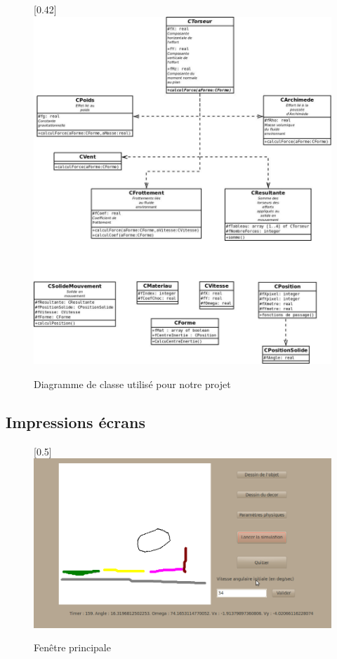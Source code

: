 \begin{center}
\begin{figure}[h]
\begin{center}
\scalebox{0.5}[0.42]{\includegraphics*{../images/UML.jpeg}}
\end{center}
\caption{Diagramme de classe utilisé pour notre projet}
\end{figure}
\end{center}
%
\newpage
\subsection{Impressions écrans}

\begin{center}
\begin{figure}[h]
\begin{center}
\scalebox{0.5}[0.5]{\includegraphics*{../images/global.jpg}}
\end{center}
\caption{Fenêtre principale}
\end{figure}
\end{center}

